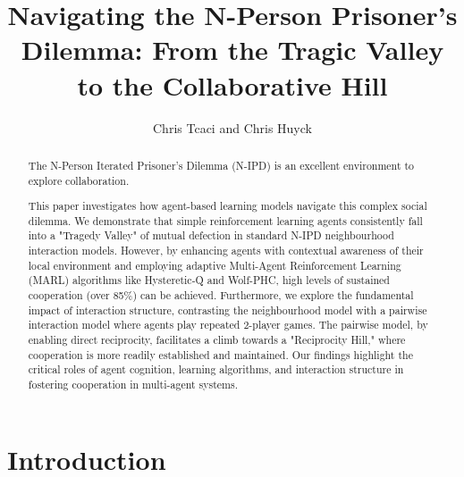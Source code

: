 \documentclass[]{llncs} %
\begin{document}
\title{Navigating the N-Person Prisoner's Dilemma: From the Tragic Valley
  to the Collaborative Hill}

\author{Chris Tcaci and Chris Huyck}

\maketitle


\begin{abstract}
  The N-Person Iterated Prisoner's Dilemma (N-IPD) is an excellent
  environment to explore collaboration.

  This paper investigates how agent-based learning models navigate this complex social dilemma. We demonstrate that simple reinforcement learning agents consistently fall into a "Tragedy Valley" of mutual defection in standard N-IPD neighbourhood interaction models. However, by enhancing agents with contextual awareness of their local environment and employing adaptive Multi-Agent Reinforcement Learning (MARL) algorithms like Hysteretic-Q and Wolf-PHC, high levels of sustained cooperation (over 85\%) can be achieved. Furthermore, we explore the fundamental impact of interaction structure, contrasting the neighbourhood model with a pairwise interaction model where agents play repeated 2-player games. The pairwise model, by enabling direct reciprocity, facilitates a climb towards a "Reciprocity Hill," where cooperation is more readily established and maintained. Our findings highlight the critical roles of agent cognition, learning algorithms, and interaction structure in fostering cooperation in multi-agent systems.

\end{abstract}

\section{Introduction}
\label{sec:introduction}
\end{document}

